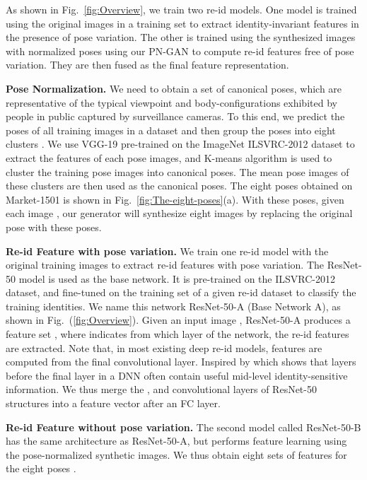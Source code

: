 \documentclass[10pt,letterpaper,twocolumn,10pt,letterpaper,twocolumn]{article}
\begin{document}
As shown in Fig.~\ref{fig:Overview}, we train two re-id models.
One model is trained using the original images in a training set to
extract identity-invariant features in the presence of pose variation.
The other is trained using the synthesized images with normalized
poses using our PN-GAN to compute re-id features free of pose variation.
They are then fused as the final feature representation.

\vspace{0.03in}

\noindent \textbf{Pose Normalization. } We need to obtain a set of
canonical poses, which are representative of the typical viewpoint
and body-configurations exhibited by people in public captured by
surveillance cameras. To this end, we predict the poses of all training
images in a dataset and then group the poses into eight clusters .
We use VGG-19 \cite{returnDevil2014BMVC} pre-trained on the ImageNet ILSVRC-2012
dataset to extract the features of each pose images, and K-means algorithm
is used to cluster the  training pose images into canonical poses.
The mean pose images of these clusters are then used as the canonical
poses. The eight poses obtained on Market-1501 \cite{market1501} is shown in Fig.~\ref{fig:The-eight-poses}(a).
With these poses, given each image , our generator
will synthesize eight images 
by replacing the original pose with these poses.

\vspace{0.03in}

\noindent \textbf{Re-id Feature with pose variation. } We train one
re-id model with the original training images to extract re-id features with pose variation. The ResNet-50 model \cite{resnet}
is used as the base network. It is pre-trained on the
ILSVRC-2012 dataset, and fine-tuned on the training set of a given
re-id dataset to classify the training identities. We name this network
ResNet-50-A (Base Network A), as shown in Fig.~(\ref{fig:Overview}). Given
an input image , ResNet-50-A produces a feature set
, where 
indicates from which layer of the network, the re-id features are
extracted. Note that, in most existing deep re-id models, features
are computed from the final convolutional layer. Inspired by \cite{liu2017hydraplus}
which shows that layers before the final layer in a DNN often contain
useful mid-level identity-sensitive information. We thus merge the
,  and  convolutional layers of ResNet-50 structures
into a  feature vector after an FC layer.

\noindent \textbf{Re-id Feature without pose variation. } The second
model called ResNet-50-B has the same architecture as ResNet-50-A, but performs
feature learning using the pose-normalized synthetic images. We thus
obtain eight sets of features for the eight poses .
\end{document}
